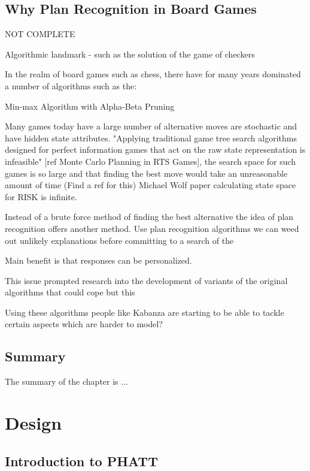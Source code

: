 \documentclass[parskip]{cs4rep}
\begin{document}
\section{Why Plan Recognition in Board Games}

NOT COMPLETE

Algorithmic landmark - such as the solution of the game of checkers 

In the realm of board games such as chess, there have for many years dominated a number of algorithms such as the:

Min-max Algorithm with Alpha-Beta Pruning

Many games today have a large number of alternative moves are stochastic and have hidden state attributes. "Applying traditional game tree search algorithms designed for perfect information games that act on the raw state representation is infeasible" [ref Monte Carlo Planning in RTS Games], the search space for such games is so large and that finding the best move would take an unreasonable amount of time (Find a ref for this) Michael Wolf paper calculating state space for RISK is infinite.

Instead of a brute force method of finding the best alternative the idea of plan recognition offers another method. Use plan recognition algorithms we can weed out unlikely explanations before committing to a search of the 

Main benefit is that responses can be personalized.

This issue prompted research into the development of variants of the original algorithms that could cope but this 

Using these algorithms people like Kabanza are starting to be able to tackle certain aspects which are harder to model?

\section{Summary}

The summary of the chapter is ...

\chapter{Design}

\section{Introduction to PHATT}
\end{document}
